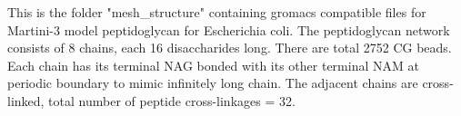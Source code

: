 This is the folder "mesh_structure" containing gromacs compatible files for Martini-3 model peptidoglycan for Escherichia coli. 
The peptidoglycan network consists of 8 chains, each 16 disaccharides long. There are total 2752 CG beads. 
Each chain has its terminal NAG bonded with its other terminal NAM at periodic boundary to mimic infinitely long chain.   
The adjacent chains are cross-linked, total number of peptide cross-linkages = 32. 
